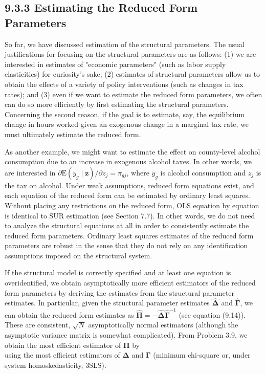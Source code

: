 \documentclass[10pt]{article}
\begin{document}
\subsection*{9.3.3 Estimating the Reduced Form Parameters}
So far, we have discussed estimation of the structural parameters. The usual justifications for focusing on the structural parameters are as follows: (1) we are interested in estimates of "economic parameters" (such as labor supply elasticities) for curiosity's sake; (2) estimates of structural parameters allow us to obtain the effects of a variety of policy interventions (such as changes in tax rates); and (3) even if we want to estimate the reduced form parameters, we often can do so more efficiently by first estimating the structural parameters. Concerning the second reason, if the goal is to estimate, say, the equilibrium change in hours worked given an exogenous change in a marginal tax rate, we must ultimately estimate the reduced form.

As another example, we might want to estimate the effect on county-level alcohol consumption due to an increase in exogenous alcohol taxes. In other words, we are interested in $\partial \mathrm{E}\left(y_{g} \mid \mathbf{z}\right) / \partial z_{j}=\pi_{g j}$, where $y_{g}$ is alcohol consumption and $z_{j}$ is the tax on alcohol. Under weak assumptions, reduced form equations exist, and each equation of the reduced form can be estimated by ordinary least squares. Without placing any restrictions on the reduced form, OLS equation by equation is identical to SUR estimation (see Section 7.7). In other words, we do not need to analyze the structural equations at all in order to consistently estimate the reduced form parameters. Ordinary least squares estimates of the reduced form parameters are robust in the sense that they do not rely on any identification assumptions imposed on the structural system.

If the structural model is correctly specified and at least one equation is overidentified, we obtain asymptotically more efficient estimators of the reduced form parameters by deriving the estimates from the structural parameter estimates. In particular, given the structural parameter estimates $\hat{\boldsymbol{\Delta}}$ and $\hat{\boldsymbol{\Gamma}}$, we can obtain the reduced form estimates as $\hat{\boldsymbol{\Pi}}=-\hat{\boldsymbol{\Delta}} \hat{\boldsymbol{\Gamma}}^{-1}$ (see equation (9.14)). These are consistent, $\sqrt{N}$ asymptotically normal estimators (although the asymptotic variance matrix is somewhat complicated). From Problem 3.9, we obtain the most efficient estimator of $\boldsymbol{\Pi}$ by\\
using the most efficient estimators of $\boldsymbol{\Delta}$ and $\boldsymbol{\Gamma}$ (minimum chi-square or, under system homoskedasticity, 3SLS).
\end{document}
